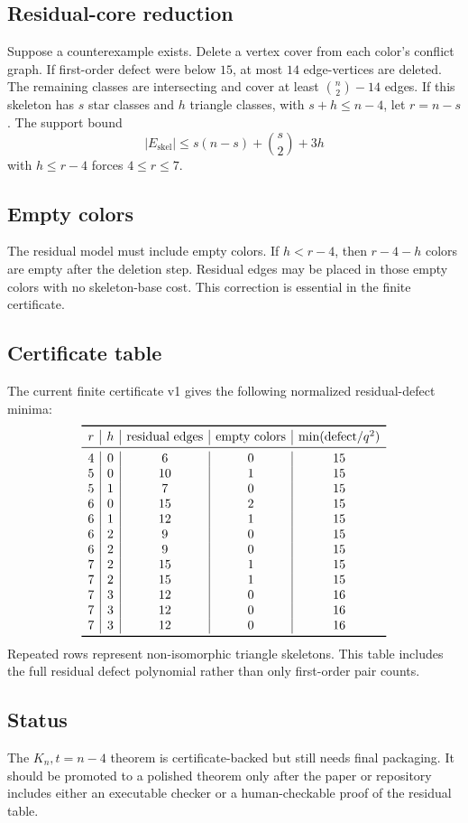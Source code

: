 \documentclass[11pt]{article}
\begin{document}
\subsection{Residual-core reduction}
Suppose a counterexample exists. Delete a vertex cover from each color's conflict graph. If first-order defect were below $15$, at most $14$ edge-vertices are deleted. The remaining classes are intersecting and cover at least $\binom n2-14$ edges. If this skeleton has $s$ star classes and $h$ triangle classes, with $s+h\le n-4$, let $r=n-s$. The support bound
\[
|E_{\mathrm{skel}}|\le s(n-s)+\binom s2+3h
\]
with $h\le r-4$ forces $4\le r\le7$.

\subsection{Empty colors}
The residual model must include empty colors. If $h<r-4$, then $r-4-h$ colors are empty after the deletion step. Residual edges may be placed in those empty colors with no skeleton-base cost. This correction is essential in the finite certificate.

\subsection{Certificate table}
The current finite certificate v1 gives the following normalized residual-defect minima:
\[
\begin{array}{c|c|c|c|c}
\toprule
r&h&\text{residual edges}&\text{empty colors}&\min(\mathrm{defect}/q^2)\\
\midrule
4&0&6&0&15\\
5&0&10&1&15\\
5&1&7&0&15\\
6&0&15&2&15\\
6&1&12&1&15\\
6&2&9&0&15\\
6&2&9&0&15\\
7&2&15&1&15\\
7&2&15&1&15\\
7&3&12&0&16\\
7&3&12&0&16\\
7&3&12&0&16\\
\bottomrule
\end{array}
\]
Repeated rows represent non-isomorphic triangle skeletons. This table includes the full residual defect polynomial rather than only first-order pair counts.

\subsection{Status}
The $K_n,t=n-4$ theorem is certificate-backed but still needs final packaging. It should be promoted to a polished theorem only after the paper or repository includes either an executable checker or a human-checkable proof of the residual table.
\end{document}
